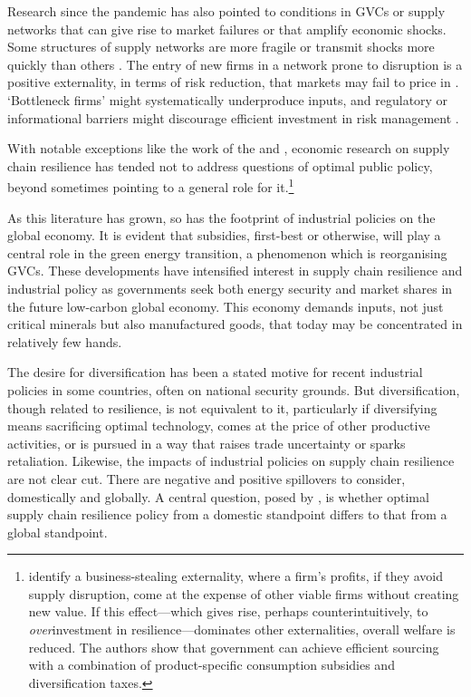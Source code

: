\documentclass{article}
\begin{document}
Research since the pandemic has also pointed to conditions in GVCs or supply networks that can give rise to market failures or that amplify economic shocks. Some structures of supply networks are more fragile or transmit shocks more quickly than others \parencite{elliott_networks_2022}. The entry of new firms in a network prone to disruption is a positive externality, in terms of risk reduction, that markets may fail to price in \parencite{bimpikis_supply_2019}. `Bottleneck firms' might systematically underproduce inputs, and regulatory or informational barriers might discourage efficient investment in risk management \parencite{carvalho_supply_nodate, productivity_commission_vulnerable_2021}. 

With notable exceptions like the work of the \textcite{productivity_commission_vulnerable_2021} and \textcite{grossman_supply_2023}, economic research on supply chain resilience has tended not to address questions of optimal public policy, beyond sometimes pointing to a general role for it.\footnote{\textcite{grossman_supply_2023} identify a business-stealing externality, where a firm's profits, if they avoid supply disruption, come at the expense of other viable firms without creating new value. If this effect---which gives rise, perhaps counterintuitively, to \textit{over}investment in resilience---dominates other externalities, overall welfare is reduced. The authors show that government can achieve efficient sourcing with a combination of product-specific consumption subsidies and diversification taxes.}

As this literature has grown, so has the footprint of industrial policies on the global economy. It is evident that subsidies, first-best or otherwise, will play a central role in the green energy transition, a phenomenon which is reorganising GVCs. These developments have intensified interest in supply chain resilience and industrial policy as governments seek both energy security and market shares in the future low-carbon global economy. This economy demands inputs, not just critical minerals but also manufactured goods, that today may be concentrated in relatively few hands.

The desire for diversification has been a stated motive for recent industrial policies in some countries, often on national security grounds. But diversification, though related to resilience, is not equivalent to it, particularly if diversifying means sacrificing optimal technology, comes at the price of other productive activities, or is pursued in a way that raises trade uncertainty or sparks retaliation. Likewise, the impacts of industrial policies on supply chain resilience are not clear cut. There are negative and positive spillovers to consider, domestically and globally. A central question, posed by \textcite{bown_modern_2024}, is whether optimal supply chain resilience policy from a domestic standpoint differs to that from a global standpoint.
\end{document}
